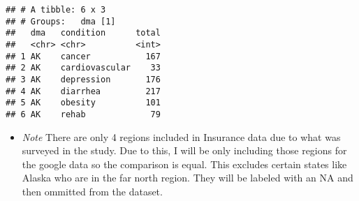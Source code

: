 \documentclass[]{article}
\newenvironment{Shaded}{\begin{snugshade}}{\end{snugshade}}
\newcommand{\DataTypeTok}[1]{\textcolor[rgb]{0.13,0.29,0.53}{#1}}
\newcommand{\DecValTok}[1]{\textcolor[rgb]{0.00,0.00,0.81}{#1}}
\newcommand{\KeywordTok}[1]{\textcolor[rgb]{0.13,0.29,0.53}{\textbf{#1}}}
\newcommand{\NormalTok}[1]{#1}
\newcommand{\OperatorTok}[1]{\textcolor[rgb]{0.81,0.36,0.00}{\textbf{#1}}}
\newcommand{\StringTok}[1]{\textcolor[rgb]{0.31,0.60,0.02}{#1}}
\providecommand{\tightlist}{%
  \setlength{\itemsep}{0pt}\setlength{\parskip}{0pt}}
\begin{document}
\begin{Shaded}
\end{Shaded}

\begin{verbatim}
## # A tibble: 6 x 3
## # Groups:   dma [1]
##   dma   condition      total
##   <chr> <chr>          <int>
## 1 AK    cancer           167
## 2 AK    cardiovascular    33
## 3 AK    depression       176
## 4 AK    diarrhea         217
## 5 AK    obesity          101
## 6 AK    rehab             79
\end{verbatim}

\begin{itemize}
\tightlist
\item
  \emph{Note} There are only 4 regions included in Insurance data due to
  what was surveyed in the study. Due to this, I will be only including
  those regions for the google data so the comparison is equal. This
  excludes certain states like Alaska who are in the far north region.
  They will be labeled with an NA and then ommitted from the dataset.
\end{itemize}
\end{document}
